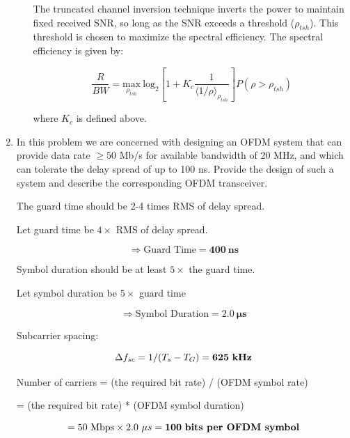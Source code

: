 \documentclass[fleqn]{article}
\begin{document}
\begin{enumerate}
\begin{enumerate}
			The truncated channel inversion technique inverts the power to maintain fixed received SNR, so long as the SNR exceeds a threshold ($\rho_{tsh}$). This threshold is chosen to maximize the spectral efficiency. The spectral efficiency is given by:
			
			\begin{equation*}
				\frac{R}{BW} = \underset{\rho_{tsh}}{\text{max}}\ \text{log}_2\left[1 + K_c\frac{1}{\langle1/\rho\rangle_{\rho_{tsh}}}\right]P(\rho > \rho_{tsh})
			\end{equation*}
			
			where $K_c$ is defined above.
			
		\end{enumerate}
		
		\item In this problem we are concerned with designing an OFDM system that can provide data rate $\geq 50$ Mb/s for available bandwidth of 20 MHz, and which can tolerate the delay spread of up to 100 ns. Provide the design of such a system and describe the corresponding OFDM transceiver.
		
		The guard time should be 2-4 times RMS of delay spread.
		
		Let guard time be $4\times$ RMS of delay spread.
		
		\begin{equation*}
			\Rightarrow \text{Guard Time} = \mathbf{400\ ns}
		\end{equation*}
		
		Symbol duration should be at least $5\times$ the guard time. 
		
		Let symbol duration be $5\times$ guard time
		
		\begin{equation*}
			\Rightarrow \text{Symbol Duration} = \mathbf{2.0\ \mu{s}}
		\end{equation*}
		
		Subcarrier spacing:
		
		\begin{equation*}
			{\Delta}f_{sc} = 1/(T_s - T_G) = \mathbf{625\ \text{\textbf{kHz}}}
		\end{equation*}
		
		Number of carriers = (the required bit rate) / (OFDM symbol rate)
		
		= (the required bit rate) * (OFDM symbol duration)
		 
		\begin{equation*}
			= 50\ \text{Mbps} \times 2.0\ {\mu}s = \mathbf{100\ \text{\textbf{bits per OFDM symbol}}}
		\end{equation*}
		

\end{enumerate}
\end{document}
